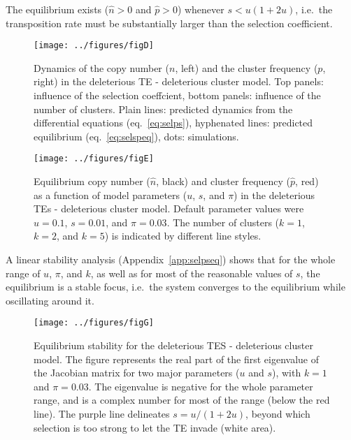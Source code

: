 \documentclass[10pt,a4paper]{article}
\begin{document}
The equilibrium exists ($\hat n > 0$ and $\hat p > 0$) whenever $s < u(1+2u)$, i.e.\ the transposition rate must be substantially larger than the selection coefficient. 

\begin{figure}
\begin{adjustwidth}{-2in}{0in}
\begin{center}
	\texttt{[image: ../figures/figD]}
\caption{\label{fig:figD} Dynamics of the copy number ($n$, left) and the cluster frequency ($p$, right) in the deleterious TE - deleterious cluster model. Top panels: influence of the selection coeffcient, bottom panels: influence of the number of clusters. Plain lines: predicted dynamics from the differential equations (eq.~\ref{eq:selps}), hyphenated lines: predicted equilibrium (eq.~\ref{eq:selspeq}), dots: simulations. }
\end{center}\end{adjustwidth}
\end{figure}


\begin{figure}
\begin{adjustwidth}{-1in}{0in}
\begin{center}
	\texttt{[image: ../figures/figE]}
\caption{\label{fig:figE} Equilibrium copy number ($\hat n$, black) and cluster frequency ($\hat p$, red) as a function of model parameters ($u$, $s$, and $\pi$) in the deleterious TEs - deleterious cluster model. Default parameter values were $u=0.1$, $s=0.01$, and $\pi=0.03$. The number of clusters ($k=1$, $k=2$, and $k=5$) is indicated by different line styles. }
\end{center}\end{adjustwidth}
\end{figure}

A linear stability analysis (Appendix~\ref{app:selpseq}) shows that for the whole range of $u$, $\pi$, and $k$, as well as for most of the reasonable values of $s$, the equilibrium is a stable focus, i.e.\ the system converges to the equilibrium while oscillating around it. 

\begin{figure}
\begin{adjustwidth}{-1in}{0in}
\begin{center}
	\texttt{[image: ../figures/figG]}
\caption{\label{fig:figG} Equilibrium stability for the deleterious TES - deleterious cluster model. The figure represents the real part of the first eigenvalue of the Jacobian matrix for two major parameters ($u$ and $s$), with $k=1$ and $\pi = 0.03$. The eigenvalue is negative for the whole parameter range, and is a complex number for most of the range (below the red line). The purple line delineates $s = u/(1+2u)$, beyond which selection is too strong to let the TE invade (white area). }
\end{center}\end{adjustwidth}
\end{figure}
\end{document}
